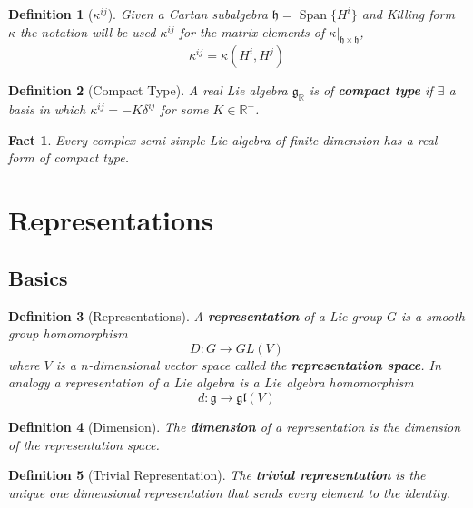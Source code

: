 \documentclass{article}
\newtheorem{definition}{Definition}[subsection]
\newtheorem{fact}{Fact}[subsection]
\DeclareMathOperator{\spn}{Span}
\newcommand{\bam}[1]{\textbf{#1}}
\newcommand{\mf}[1]{\mathfrak{#1}}
\newcommand{\set}[1]{\lbrace #1 \rbrace}
\begin{document}
\begin{definition}[$\kappa^{ij}$]
Given a Cartan subalgebra $\mf{h}=\spn\set{ H^i }$ and Killing form $\kappa$ the notation will be used $\kappa^{ij}$ for the matrix elements of $\kappa |_{\mf{h}\times\mf{h}}$,
\[
\kappa^{ij}=\kappa(H^i, H^j)
\]
\end{definition}

\begin{definition}[Compact Type]
A real Lie algebra $\mf{g}_\mathbb{R}$ is of \bam{compact type} if $\exists$ a basis in which $\kappa^{ij}=-K\delta^{ij}$ for some $K\in\mathbb{R}^{+}$.
\end{definition}

\begin{fact}
Every complex semi-simple Lie algebra of finite dimension has a real form of compact type.
\end{fact}

\section{Representations}

\subsection{Basics}

\begin{definition}[Representations]
A \bam{representation} of a Lie group $G$ is a smooth group homomorphism 
\[
D:G\to GL\left(V\right)
\]
where $V$ is a $n$-dimensional vector space called the \bam{representation space}.
In analogy a representation of a Lie algebra is a Lie algebra homomorphism 
\[
d:\mf{g} \to \mf{gl}\left(V\right)
\]
\end{definition}

\begin{definition}[Dimension]
The \bam{dimension} of a representation is the dimension of the representation space.
\end{definition}

\begin{definition}[Trivial Representation] 
The \bam{trivial representation} is the unique one dimensional representation that sends every element to the identity. 
\end{definition}
\end{document}

